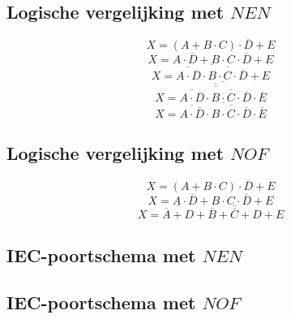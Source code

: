 \documentclass[11pt, a4paper]{report}
\begin{document}
\subsection*{Logische vergelijking met $NEN$}

\begin{equation*}
  X = (A + B\cdot C)\cdot \overline{D} + E
\end{equation*}
\begin{equation*}
  X = A \cdot \overline{D} + B \cdot C \cdot \overline{D} + E
\end{equation*}
\begin{equation*}
  X = \overline{\overline{A \cdot \overline{D}}\cdot \overline{B \cdot C \cdot \overline{D}}}+ E
\end{equation*}
\begin{equation*}
  X = \overline{\overline{\overline{\overline{A \cdot \overline{D}}\cdot \overline{B \cdot C \cdot \overline{D}}}} \cdot \overline{E}}
\end{equation*}
\begin{equation*}
  X = \overline{\overline{A \cdot \overline{D}}\cdot \overline{B \cdot C \cdot \overline{D}} \cdot \overline{E}}
\end{equation*}

\subsection*{Logische vergelijking met $NOF$}
\begin{equation*}
  X = (A + B\cdot C)\cdot \overline{D} + E
\end{equation*}
\begin{equation*}
  X = A \cdot \overline{D} + B \cdot C \cdot \overline{D} + E
\end{equation*}
\begin{equation*}
  X = \overline{ \overline{A} + D } + \overline{ \overline{B} + \overline{C} + D} + E
\end{equation*}

\subsection*{IEC-poortschema met $NEN$}

\vspace{10 cm}

\subsection*{IEC-poortschema met $NOF$}

\vspace{10 cm}
\end{document}
